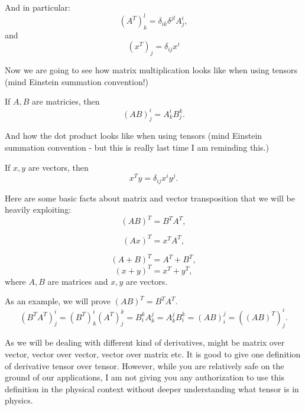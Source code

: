 \documentclass[main.tex]{subfiles}
\begin{document}
And in particular:
\begin{equation}
(A^T)^l_k = \delta_{ik}\delta^{jl} A^i_j , 
\end{equation}
and 
\begin{equation}
(x^T)_j = \delta_{ij} x^i
\end{equation}

Now we are going to see how matrix multiplication looks like when using tensors (mind Einstein summation convention!)

\begin{theorem}
If $A,B$ are matricies, then 
\begin{equation}
(AB)^i_j = A^i_k B^k_j. 
\end{equation}
\end{theorem}

And how the dot product looks like when using tensors (mind Einstein summation convention - but this is really last time I am reminding this.)

\begin{theorem}
If $x, y$ are vectors, then
\begin{equation}
x^T y = \delta_{ij} x^i y^j.
\end{equation}
\end{theorem}

Here are some basic facts about matrix and vector transposition that we will be heavily exploiting:
\begin{equation}
    (AB)^T = B^T A^T,
\end{equation}

\begin{equation}
    (Ax)^T = x^T A^T,
\end{equation}

\begin{equation}
(A + B)^T = A^T + B^T,
\end{equation}
\begin{equation}
    (x + y)^T = x^T + y^T,
\end{equation}
where $A, B$ are matrices and $x, y$ are vectors.

As an example, we will prove $(AB)^T = B^T A^T$.
\begin{equation}
    (B^TA^T)^i_j = (B^T)^i_k (A^T)^k_j = B^k_i A^j_k = A^j_k B^k_i = (AB)^j_i = ((AB)^T)^i_j.
\end{equation}

\indent

As we will be dealing with different kind of derivatives, might be matrix over vector, vector over vector, vector over matrix etc. It is good to give one definition of derivative tensor over tensor. However, while you are relatively safe on the ground of our applications, I am not giving you any authorization to use this definition in the physical context without deeper understanding what tensor is in physics.
\end{document}
